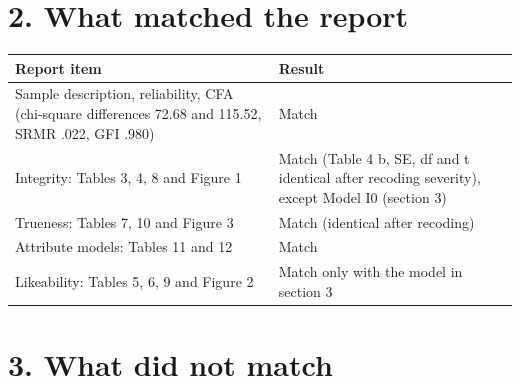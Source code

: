 \documentclass[
]{article}
\newcounter{none} %
\begin{document}
\section{2. What matched the report}\label{what-matched-the-report}

{\def\LTcaptype{none} %
\begin{longtable}[]{@{}
  >{\raggedright\arraybackslash}p{}
  >{\raggedright\arraybackslash}p{}@{}}
\toprule\noalign{}
\begin{minipage}[b]{\linewidth}\raggedright
Report item
\end{minipage} & \begin{minipage}[b]{\linewidth}\raggedright
Result
\end{minipage} \\
\midrule\noalign{}
\endhead
\bottomrule\noalign{}
\endlastfoot
Sample description, reliability, CFA (chi-square differences 72.68 and
115.52, SRMR .022, GFI .980) & Match \\
Integrity: Tables 3, 4, 8 and Figure 1 & Match (Table 4 b, SE, df and t
identical after recoding severity), except Model I0 (section 3) \\
Trueness: Tables 7, 10 and Figure 3 & Match (identical after
recoding) \\
Attribute models: Tables 11 and 12 & Match \\
Likeability: Tables 5, 6, 9 and Figure 2 & Match only with the model in
section 3 \\
\end{longtable}
}

\section{3. What did not match}\label{what-did-not-match}
\end{document}
